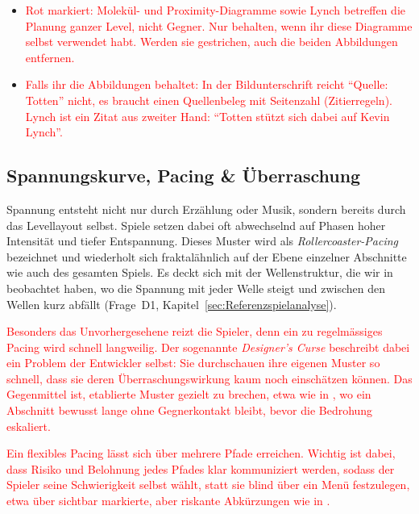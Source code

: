 \documentclass[../Main.tex]{subfiles}
\begin{document}
\begin{itemize}[leftmargin=1.5cm]
    \item \textcolor{red}{Rot markiert: Molekül- und Proximity-Diagramme sowie Lynch betreffen die Planung ganzer Level, nicht Gegner. Nur behalten, wenn ihr diese Diagramme selbst verwendet habt. Werden sie gestrichen, auch die beiden Abbildungen entfernen.}
    \item \textcolor{red}{Falls ihr die Abbildungen behaltet: In der Bildunterschrift reicht \enquote{Quelle: Totten} nicht, es braucht einen Quellenbeleg mit Seitenzahl (Zitierregeln). Lynch ist ein Zitat aus zweiter Hand: \enquote{Totten stützt sich dabei auf Kevin Lynch}.}
\end{itemize}

\subsection{Spannungskurve, Pacing \& Überraschung} \label{sec:Pacing}
Spannung entsteht nicht nur durch Erzählung oder Musik, sondern bereits durch das Levellayout selbst. Spiele setzen dabei oft abwechselnd auf Phasen hoher Intensität und tiefer Entspannung. Dieses Muster wird als \textit{Rollercoaster-Pacing} bezeichnet und wiederholt sich fraktalähnlich auf der Ebene einzelner Abschnitte wie auch des gesamten Spiels.\autocite{gdc_tenprinciples2010} Es deckt sich mit der Wellenstruktur, die wir in  beobachtet haben, wo die Spannung mit jeder Welle steigt und zwischen den Wellen kurz abfällt (Frage~D1, Kapitel~\ref{sec:Referenzspielanalyse}).

\textcolor{red}{Besonders das Unvorhergesehene reizt die Spieler, denn ein zu regelmässiges Pacing wird schnell langweilig. Der sogenannte \textit{Designer's Curse} beschreibt dabei ein Problem der Entwickler selbst: Sie durchschauen ihre eigenen Muster so schnell, dass sie deren Überraschungswirkung kaum noch einschätzen können. Das Gegenmittel ist, etablierte Muster gezielt zu brechen, etwa wie in ,\autocite{visceral_deadspace2_2011} wo ein Abschnitt bewusst lange ohne Gegnerkontakt bleibt, bevor die Bedrohung eskaliert.\autocite{gdc_tenprinciples2010}}

\textcolor{red}{Ein flexibles Pacing lässt sich über mehrere Pfade erreichen. Wichtig ist dabei, dass Risiko und Belohnung jedes Pfades klar kommuniziert werden, sodass der Spieler seine Schwierigkeit selbst wählt, statt sie blind über ein Menü festzulegen, etwa über sichtbar markierte, aber riskante Abkürzungen wie in .\autocite{criterion_burnout_2001,gdc_tenprinciples2010}}
\end{document}
